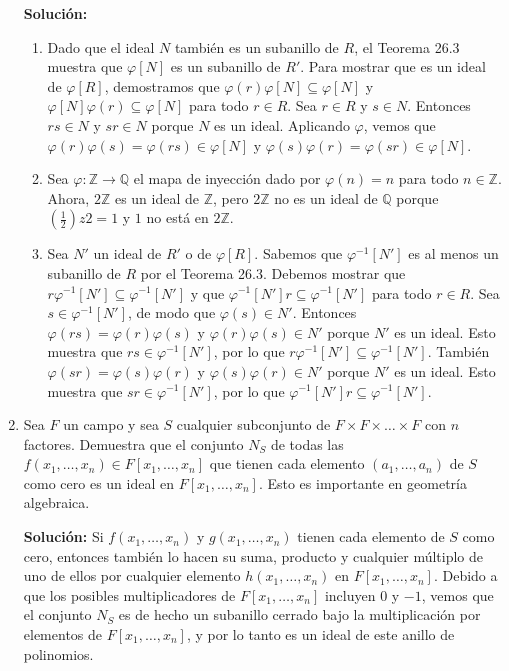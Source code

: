 \begin{enumerate}
\textbf{Solución:}
\begin{enumerate}
    \item Dado que el ideal \( N \) también es un subanillo de \( R \), el Teorema 26.3 muestra que \( \varphi[N] \) es un subanillo de \( R' \). Para mostrar que es un ideal de \( \varphi[R] \), demostramos que \( \varphi(r)\varphi[N] \subseteq \varphi[N] \) y \( \varphi[N]\varphi(r) \subseteq \varphi[N] \) para todo \( r \in R \). Sea \( r \in R \) y \( s \in N \). Entonces \( rs \in N \) y \( sr \in N \) porque \( N \) es un ideal. Aplicando \( \varphi \), vemos que \( \varphi(r)\varphi(s) = \varphi(rs) \in \varphi[N] \) y \( \varphi(s)\varphi(r) = \varphi(sr) \in \varphi[N] \).
    \item Sea \( \varphi : \mathbb{Z} \rightarrow \mathbb{Q} \) el mapa de inyección dado por \( \varphi(n) = n \) para todo \( n \in \mathbb{Z} \). Ahora, \( 2\mathbb{Z} \) es un ideal de \( \mathbb{Z} \), pero \( 2\mathbb{Z} \) no es un ideal de \( \mathbb{Q} \) porque \( (\frac{1}{2})z2 = 1 \) y \( 1 \) no está en \( 2\mathbb{Z} \).
    \item  Sea \( N' \) un ideal de \( R' \) o de \( \varphi[R] \). Sabemos que \( \varphi^{-1}[N'] \) es al menos un subanillo de \( R \) por el Teorema 26.3. Debemos mostrar que \( r\varphi^{-1}[N'] \subseteq \varphi^{-1}[N'] \) y que \( \varphi^{-1}[N']r \subseteq \varphi^{-1}[N'] \) para todo \( r \in R \). Sea \( s \in \varphi^{-1}[N'] \), de modo que \( \varphi(s) \in N' \). Entonces \( \varphi(rs) = \varphi(r)\varphi(s) \) y \( \varphi(r)\varphi(s) \in N' \) porque \( N' \) es un ideal. Esto muestra que \( rs \in \varphi^{-1}[N'] \), por lo que \( r\varphi^{-1}[N'] \subseteq \varphi^{-1}[N'] \). También \( \varphi(sr) = \varphi(s)\varphi(r) \) y \( \varphi(s)\varphi(r) \in N' \) porque \( N' \) es un ideal. Esto muestra que \( sr \in \varphi^{-1}[N'] \), por lo que \( \varphi^{-1}[N']r \subseteq \varphi^{-1}[N'] \).
\end{enumerate}

\item Sea \( F \) un campo y sea \( S \) cualquier subconjunto de \( F \times F \times \dots \times F \) con \( n \) factores. Demuestra que el conjunto \( N_S \) de todas las \( f(x_1, \dots, x_n) \in F[x_1, \dots, x_n] \) que tienen cada elemento \( (a_1, \dots, a_n) \) de \( S \) como cero es un ideal en \( F[x_1, \dots, x_n] \). Esto es importante en geometría algebraica.

\textbf{Solución:}
 Si \( f(x_1, \dots, x_n) \) y \( g(x_1, \dots, x_n) \) tienen cada elemento de \( S \) como cero, entonces también lo hacen su suma, producto y cualquier múltiplo de uno de ellos por cualquier elemento \( h(x_1, \dots, x_n) \) en \( F[x_1, \dots, x_n] \). Debido a que los posibles multiplicadores de \( F[x_1, \dots, x_n] \) incluyen \( 0 \) y \( -1 \), vemos que el conjunto \( N_S \) es de hecho un subanillo cerrado bajo la multiplicación por elementos de \( F[x_1, \dots, x_n] \), y por lo tanto es un ideal de este anillo de polinomios.


\end{enumerate}
